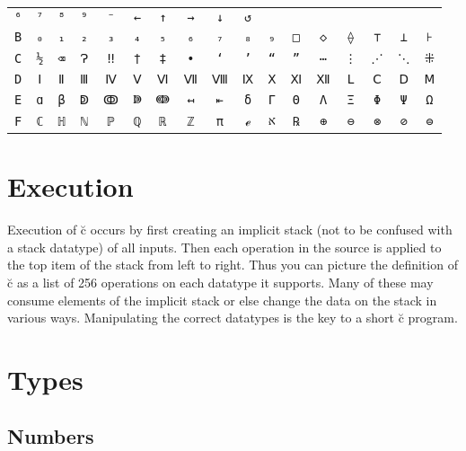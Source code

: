 \documentclass{article}
\begin{document}
\begin{tabular}{c c c c c c c c c c c c c c c c c}
\verb|⁶| & \verb|⁷| & \verb|⁸| & \verb|⁹| & \verb|⁻| & \verb|←| & \verb|↑| &
\verb|→| & \verb|↓| & \verb|↺| \\
\verb|B| & \verb|₀| & \verb|₁| & \verb|₂| & \verb|₃| & \verb|₄| & \verb|₅| &
\verb|₆| & \verb|₇| & \verb|₈| & \verb|₉| & \verb|□| & \verb|◇| & \verb|⟠| &
\verb|⊤| & \verb|⊥| & \verb|⊦| \\
\verb|C| & \verb|½| & \verb|⌫| & \verb|Ɂ| & \verb|‼| & \verb|†| & \verb|‡| &
\verb|•| & \verb|‘| & \verb|’| & \verb|“| & \verb|”| & \verb|⋯| & \verb|⋮| &
\verb|⋰| & \verb|⋱| & \verb|⁜| \\
\verb|D| & \verb|Ⅰ| & \verb|Ⅱ| & \verb|Ⅲ| & \verb|Ⅳ| & \verb|Ⅴ| & \verb|Ⅵ| &
\verb|Ⅶ| & \verb|Ⅷ| & \verb|Ⅸ| & \verb|Ⅹ| & \verb|Ⅺ| & \verb|Ⅻ| & \verb|Ⅼ| &
\verb|Ⅽ| & \verb|Ⅾ| & \verb|Ⅿ| \\
\verb|E| & \verb|ɑ| & \verb|β| & \verb|ↁ| & \verb|ↂ| & \verb|ↇ| & \verb|ↈ| &
\verb|↤| & \verb|⇤| & \verb|δ| & \verb|Γ| & \verb|Θ| & \verb|Λ| & \verb|Ξ| &
\verb|Φ| & \verb|Ψ| & \verb|Ω| \\
\verb|F| & \verb|ℂ| & \verb|ℍ| & \verb|ℕ| & \verb|ℙ| & \verb|ℚ| & \verb|ℝ| &
\verb|ℤ| & \verb|π| & \verb|ℯ| & \verb|א| & \verb|℞| & \verb|⊕| & \verb|⊖| &
\verb|⊗| & \verb|⊘| & \verb|⊜| \\
\end{tabular}

\section{Execution}


Execution of \u{c} occurs by first creating an implicit stack (not to be
confused with a stack datatype) of all inputs. Then each operation in the source
is applied to the top item of the stack from left to right. Thus you can picture
the definition of \u{c} as a list of 256 operations on each datatype it
supports. Many of these may consume elements of the implicit stack or else
change the data on the stack in various ways. Manipulating the correct datatypes
is the key to a short \u{c} program.

\section{Types} %

\subsection{Numbers}
\end{document}
